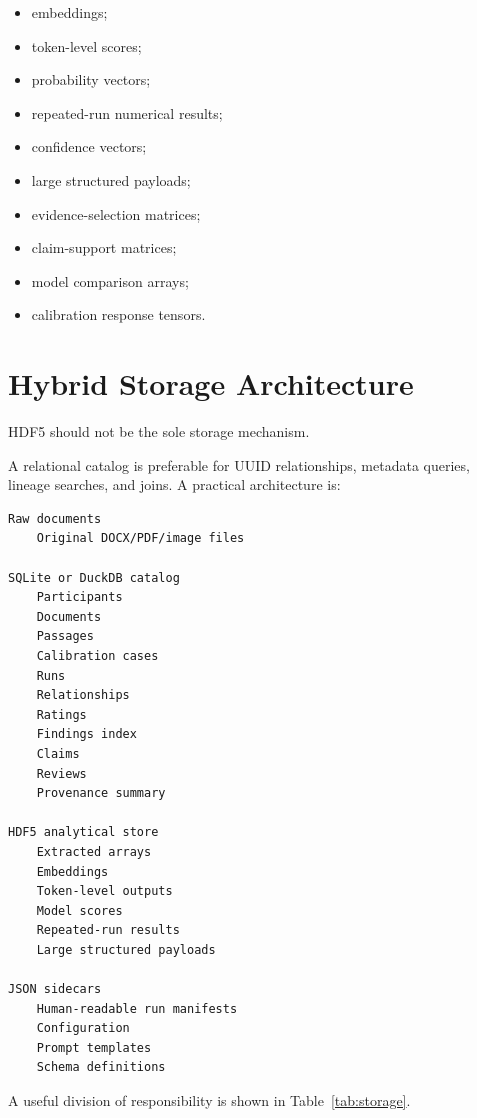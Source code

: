 \documentclass[11pt]{report}
\begin{document}
\begin{itemize}
  \item embeddings;
  \item token-level scores;
  \item probability vectors;
  \item repeated-run numerical results;
  \item confidence vectors;
  \item large structured payloads;
  \item evidence-selection matrices;
  \item claim-support matrices;
  \item model comparison arrays;
  \item calibration response tensors.
\end{itemize}

\chapter{Hybrid Storage Architecture}

HDF5 should not be the sole storage mechanism.

A relational catalog is preferable for UUID relationships, metadata queries, lineage searches, and joins. A practical architecture is:

\begin{verbatim}
Raw documents
    Original DOCX/PDF/image files

SQLite or DuckDB catalog
    Participants
    Documents
    Passages
    Calibration cases
    Runs
    Relationships
    Ratings
    Findings index
    Claims
    Reviews
    Provenance summary

HDF5 analytical store
    Extracted arrays
    Embeddings
    Token-level outputs
    Model scores
    Repeated-run results
    Large structured payloads

JSON sidecars
    Human-readable run manifests
    Configuration
    Prompt templates
    Schema definitions
\end{verbatim}

A useful division of responsibility is shown in Table~\ref{tab:storage}.
\end{document}
